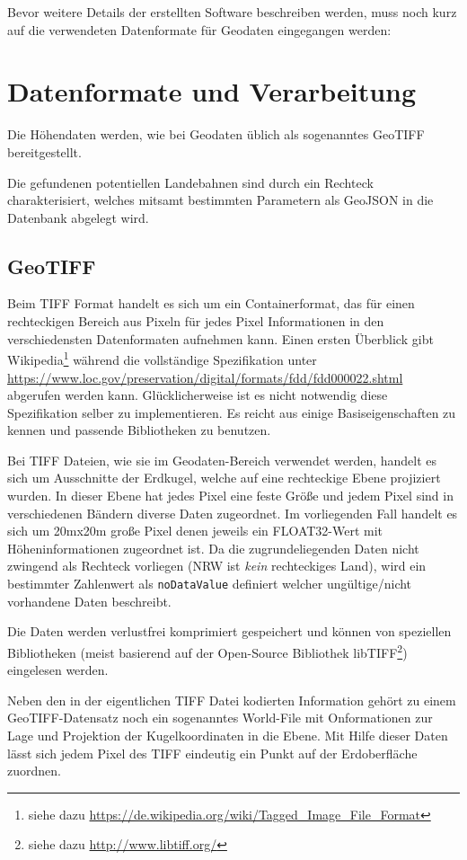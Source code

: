 \documentclass[10pt,a4paper]{report}
\begin{document}
Bevor weitere Details der erstellten Software beschreiben werden, muss noch kurz auf die verwendeten Datenformate für Geodaten eingegangen werden:

\section{Datenformate und Verarbeitung}
Die Höhendaten werden, wie bei Geodaten üblich als sogenanntes GeoTIFF bereitgestellt. 

Die gefundenen potentiellen Landebahnen sind durch ein Rechteck charakterisiert, welches mitsamt bestimmten Parametern als GeoJSON in die Datenbank abgelegt wird.

\subsection{GeoTIFF}
Beim TIFF Format handelt es sich um ein Containerformat, das für einen rechteckigen Bereich aus Pixeln für jedes Pixel Informationen in den verschiedensten Datenformaten aufnehmen kann. Einen ersten Überblick gibt Wikipedia\footnote{siehe dazu \url{https://de.wikipedia.org/wiki/Tagged_Image_File_Format}} während die vollständige Spezifikation unter \url{https://www.loc.gov/preservation/digital/formats/fdd/fdd000022.shtml} abgerufen werden kann. Glücklicherweise ist es nicht notwendig diese Spezifikation selber zu implementieren. Es reicht aus einige Basiseigenschaften zu kennen und passende Bibliotheken zu benutzen.

Bei TIFF Dateien, wie sie im Geodaten-Bereich verwendet werden, handelt es sich um Ausschnitte der Erdkugel, welche auf eine rechteckige Ebene projiziert wurden. In dieser Ebene hat jedes Pixel eine feste Größe und jedem Pixel sind in verschiedenen Bändern diverse Daten zugeordnet. Im vorliegenden Fall handelt es sich um 20mx20m große Pixel denen jeweils ein FLOAT32-Wert mit Höheninformationen zugeordnet ist.
Da die zugrundeliegenden Daten nicht zwingend als Rechteck vorliegen (NRW ist \emph{kein} rechteckiges Land), wird ein bestimmter Zahlenwert als \verb|noDataValue| definiert welcher ungültige/nicht vorhandene Daten beschreibt.

Die Daten werden verlustfrei komprimiert gespeichert und können von speziellen Bibliotheken (meist basierend auf der Open-Source Bibliothek libTIFF\footnote{siehe dazu \url{http://www.libtiff.org/}}) eingelesen werden.

Neben den in der eigentlichen TIFF Datei kodierten Information gehört zu einem GeoTIFF-Datensatz noch ein sogenanntes World-File mit Onformationen zur Lage und Projektion der Kugelkoordinaten in die Ebene. Mit Hilfe dieser Daten lässt sich jedem Pixel des TIFF eindeutig ein Punkt auf der Erdoberfläche zuordnen.
\end{document}
